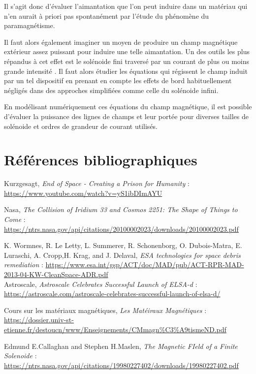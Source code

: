 \documentclass[a4paper,1pt]{article}
\begin{document}
Il s'agit donc d'évaluer l'aimantation que l'on peut induire dans un matériau qui n'en aurait à priori pas spontanément par l'étude du phénomène du paramagnétisme.

Il faut alors également imaginer un moyen de produire un champ magnétique extérieur assez puissant pour induire une telle aimantation. Un des outils les plus répandus à cet effet est le solénoide fini traversé par un courant de plus ou moins grande intensité \cite{Solenoide}. Il faut alors étudier les équations qui régissent le champ induit par un tel dispositif en prenant en compte les effets de bord habituellement négligés dans des approches simplifiées comme celle du solénoide infini. 

En modélisant numériquement ces équations du champ magnétique, il est possible d'évaluer la puissance des lignes de champs et leur portée pour diverses tailles de solénoide et ordres de grandeur de courant utilisés.
\section{Références bibliographiques}
\begin{thebibliography}{11}
	Kurzgesagt, \textit{End of Space - Creating a Prison for Humanity} :
	\url{https://www.youtube.com/watch?v=yS1ibDImAYU}

    Nasa, \textit{The Collision of Iridium 33 and Cosmos 2251: The Shape of Things to Come} : \url{https://ntrs.nasa.gov/api/citations/20100002023/downloads/20100002023.pdf}

K. Wormnes, R. Le Letty, L. Summerer, R. Schonenborg, O. Dubois-Matra, E. Luraschi, A. Cropp,H. Krag, and J. Delaval, \textit{ESA technologies for space debris remediation} :
	\url{https://www.esa.int/gsp/ACT/doc/MAD/pub/ACT-RPR-MAD-2013-04-KW-CleanSpace-ADR.pdf}\\

Astroscale, \textit{Astroscale Celebrates Successful Launch of ELSA-d} : \url{https://astroscale.com/astroscale-celebrates-successful-launch-of-elsa-d/}

Cours sur les matériaux magnétiques, \textit{Les Matéiraux Magnétiques} : \url{https://dossier.univ-st-etienne.fr/destoucn/www/Enseignements/CMmagn%C3%A9tismeND.pdf}

Edmund E.Callaghan and Stephen H.Maslen, \textit{The Magnetic FIeld of a Finite Solenoide} : \url{https://ntrs.nasa.gov/api/citations/19980227402/downloads/19980227402.pdf}
\end{thebibliography}
\end{document}
